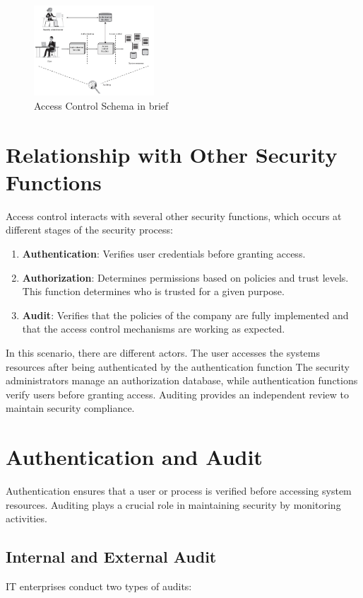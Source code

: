 \begin{figure}[H]
  \centering
  \includegraphics[width=0.4\textwidth]{img/Access Control Principles.png}
  \caption{Access Control Schema in brief}
\end{figure}


\section{Relationship with Other Security Functions}
Access control interacts with several other security functions, which
occurs at different stages of the security process:

\begin{enumerate}
    \item \textbf{Authentication}: Verifies user credentials before
      granting access.
    \item \textbf{Authorization}: Determines permissions based on
      policies and trust levels. This function determines who is
      trusted for a given purpose.
    \item \textbf{Audit}: Verifies that the policies of the company
      are fully implemented and that the access control mechanisms are
      working as expected.
  \end{enumerate}

In this scenario, there are different actors. The user accesses the
systems resources after being authenticated by the authentication
function The security administrators manage an authorization database,
while authentication functions verify users before granting access.
Auditing provides an independent review to maintain security
compliance.

\section{Authentication and Audit}
Authentication ensures that a user or process is verified before accessing
system resources. Auditing plays a crucial role in maintaining security by
monitoring activities.

\subsection{Internal and External Audit}
IT enterprises conduct two types of audits:

